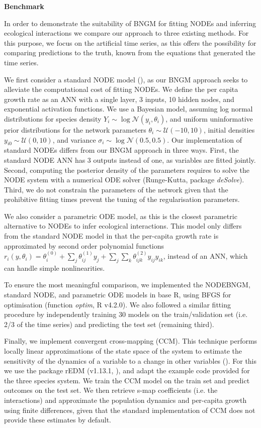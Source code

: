 \documentclass[11pt, oneside]{article}
\begin{document}
\textbf{Benchmark}

In order to demonstrate the suitability of BNGM for fitting NODEs and inferring ecological interactions we compare our approach to three existing methods.
For this purpose, we focus on the artificial time series, as this offers the possibility for comparing predictions to the truth, known from the equations that generated the time series.

We first consider a standard NODE model (\cite{Bonnaffe2021a}), as our BNGM approach seeks to alleviate the computational cost of fitting NODEs.
We define the per capita growth rate as an ANN with a single layer, 3 inputs, 10 hidden nodes, and exponential activation functions.
We use a Bayesian model, assuming log normal distributions for species density $Y_i \sim \log\mathcal{N}(y_i,\theta_i)$, and uniform uninformative prior distributions for the network parameters $\theta_i \sim \mathcal{U}(-10,10)$, initial densities $y_{i0} \sim \mathcal{U}(0,10)$, and variance $\sigma_i \sim \log\mathcal{N}(0.5,0.5)$.
Our implementation of standard NODEs differs from our BNGM approach in three ways.
First, the standard NODE ANN has 3 outputs instead of one, as variables are fitted jointly.
Second, computing the posterior density of the parameters requires to solve the NODE system with a numerical ODE solver (Runge-Kutta, package \textit{deSolve}).
Third, we do not constrain the parameters of the network given that the prohibitive fitting times prevent the tuning of the regularisation parameters.

We also consider a parametric ODE model, as this is the closest parametric alternative to NODEs to infer ecological interactions.
This model only differs from the standard NODE model in that the per-capita growth rate is approximated by second order polynomial functions $r_i(y,\theta_i) = \theta_i^{(0)} + \sum_j \theta_{ij}^{(1)} y_j + \sum_j \sum_k \theta_{ijk}^{(2)} y_{ij} y_{ik}$, instead of an ANN, which can handle simple nonlinearities.

To ensure the most meaningful comparison, we implemented the NODEBNGM, standard NODE, and parametric ODE models in base R, using BFGS for optimisation (function \textit{optim}, R v4.2.0).
We also followed a similar fitting procedure by independently training 30 models on the train/validation set (i.e. 2/3 of the time series) and predicting the test set (remaining third).

Finally, we implement convergent cross-mapping (CCM).
This technique performs locally linear approximations of the state space of the system to estimate the sensitivity of the dynamics of a variable to a change in other variables (\cite{Sugihara2012}).
For this we use the package rEDM (v1.13.1, \cite{Sugihara2012}), and adapt the example code provided for the three species system.
We train the CCM model on the train set and predict outcomes on the test set.
We then retrieve s-map coefficients (i.e. the interactions) and approximate the population dynamics and per-capita growth using finite differences, given that the standard implementation of CCM does not provide these estimates by default.
\end{document}
